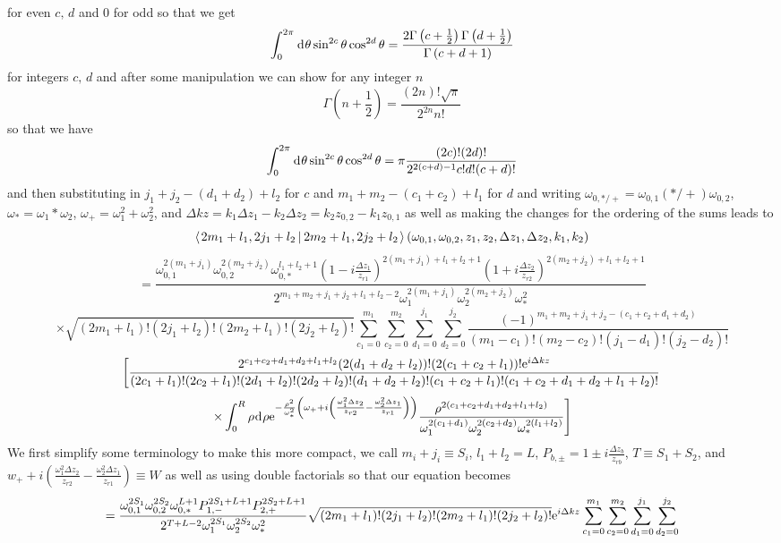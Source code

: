 \documentclass[11pt]{amsart}
\makeatletter
\newcommand{\e}{{\rm e}}				%
\newcommand{\msp}[1]{\mspace{#1mu}}		%
\newcommand{\0}{\varnothing}		%
\newcommand{\eq}{\equiv}		%
\newcommand{\dd}{\msp{1} {\rm{d}} \msp{1}}	%
\newcommand{\brac}[2]{\left\langle\msp{2} #1\left\lvert \msp{3.5} #2 \right.\right\rangle}	%
\newcommand{\1}{!}
\newcommand{\2}{@}
\newcommand{\3}{\#}
\newcommand{\4}{\$}
\newcommand{\5}{\%}
\newcommand{\6}{$^\wedge$}
\newcommand{\7}{\&}
\newcommand{\8}{*}
\newcommand{\9}{(}
\makeatother
\begin{document}
for even $c,\,d$ and 0 for odd so that we get
\[
\int_0^{2\pi} \dd \theta \sin^{2c}\theta \cos^{2d}\theta = \frac{2\Gamma\left(c+\frac{1}{2}\right)\Gamma\left(d+\frac{1}{2}\right)}{\Gamma\left(c+d+1\right)}
\]
for integers $c,\, d$ and after some manipulation we can show for any integer $n$
\[
\Gamma\left(n+\frac{1}{2}\right) = \frac{(2n)!\sqrt{\pi}}{2^{2n}n!}
\]
so that we have
\[
\int_0^{2\pi} \dd \theta \sin^{2c}\theta \cos^{2d}\theta = \pi \frac{(2c)!(2d)!}{2^{2(c+d)-1}c!d!(c+d)!}
\]
and then substituting in $j_1+j_2-(d_1+d_2)+l_2$ for $c$ and $m_1+m_2-(c_1+c_2)+l_1$ for $d$ and writing $\omega_{0,*/+} = \omega_{0,1}(*/+)\omega_{0,2}$,  $\omega_{*} = \omega_1*\omega_2$, $\omega_{+} = \omega_1^2+\omega_2^2$, and $\Delta kz = k_1\Delta z_1-k_2\Delta z_2 = k_2z_{0,2}-k_1z_{0,1}$ as well as making the changes for the ordering of the sums  leads to
\[
\brac{2m_1+l_1,2j_1+l_2}{2m_2+l_1,2j_2+l_2}(\omega_{0,1},\omega_{0,2},z_1,z_2,\Delta z_1,\Delta z_2,k_1,k_2)
\]
\[ 
=\frac{\omega_{0,1}^{2(m_1+j_1)}\omega_{0,2}^{2(m_2+j_2)}\omega_{0,*}^{l_1+l_2+1}\left(1-i\frac{\Delta z_1}{z_{r1}}\right)^{2(m_1+j_1)+l_1+l_2+1}\left(1+i\frac{\Delta z_2}{z_{r2}}\right)^{2(m_2+j_2)+l_1+l_2+1}}{2^{m_1+m_2+j_1+j_2+l_1+l_2-2}\omega_1^{2(m_1+j_1)}\omega_2^{2(m_2+j_2)}\omega_{*}^2}
\]
\[
\times\sqrt{(2m_1+l_1)!(2j_1+l_2)!(2m_2+l_1)!(2j_2+l_2)!}\sum_{c_1=0}^{m_1}\sum_{c_2=0}^{m_2}\sum_{d_1=0}^{j_1}\sum_{d_2=0}^{j_2}\frac{(-1)^{m_1+m_2+j_1+j_2-(c_1+c_2+d_1+d_2)}}{(m_1-c_1)!(m_2-c_2)!(j_1-d_1)!(j_2-d_2)!}
\]
\[
\left[\frac{2^{c_1+c_2+d_1+d_2+l_1+l_2}(2(d_1+d_2+l_2))!(2(c_1+c_2+l_1))!\e^{i\Delta kz}}{(2c_1+l_1)!(2c_2+l_1)!(2d_1+l_2)!(2d_2+l_2)!(d_1+d_2+l_2)!(c_1+c_2+l_1)!(c_1+c_2+d_1+d_2+l_1+l_2)!}\right.
\]
\[
\left.\times \int_0^R\rho \dd \rho \e^{-\frac{\rho^2}{\omega_{*}^2}\left(\omega_++i\left(\frac{\omega_1^2\Delta z_2}{z_{r2}}-\frac{\omega_2^2\Delta z_1}{z_{r1}}\right)\right)}\frac{\rho^{2(c_1+c_2+d_1+d_2+l_1+l_2)}}{\omega_1^{2(c_1+d_1)}\omega_2^{2(c_2+d_2)}\omega_*^{2(l_1+l_2)}}\right]
\]
We first simplify some terminology to make this more compact, we call $m_i+j_i \eq S_i$, $l_1+l_2 = L$, $P_{b,\pm} = 1\pm i\frac{\Delta z_b}{z_{rb}}$, $T\eq S_1+S_2$,  and  $w_++i\left(\frac{\omega_1^2\Delta z_2}{z_{r2}}-\frac{\omega_2^2\Delta z_1}{z_{r1}}\right)\eq W$ as well as using double factorials so that our equation becomes
\[
=\frac{\omega_{0,1}^{2S_1}\omega_{0,2}^{2S_2}\omega_{0,*}^{L+1}P_{1,-}^{2S_1+L+1}P_{2,+}^{2S_2+L+1}}{2^{T+L-2}\omega_1^{2S_1}\omega_2^{2S_2}\omega_*^2}\sqrt{(2m_1+l_1)!(2j_1+l_2)!(2m_2+l_1)!(2j_2+l_2)!}\e^{i\Delta kz}\sum_{c_1=0}^{m_1}\sum_{c_2=0}^{m_2}\sum_{d_1=0}^{j_1}\sum_{d_2=0}^{j_2}
\]
\end{document}

